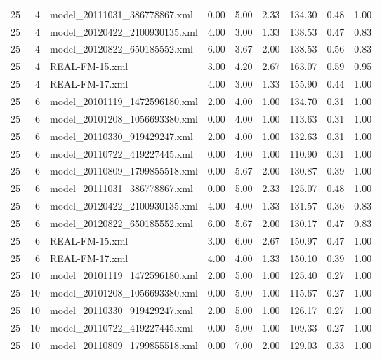 \begin{table}[ht]
\begin{tabular}{rrlrrrrrr}
   25 &   4 & model\_20111031\_386778867.xml & 0.00 & 5.00 & 2.33 & 134.30 & 0.48 & 1.00 \\ 
   25 &   4 & model\_20120422\_2100930135.xml & 4.00 & 3.00 & 1.33 & 138.53 & 0.47 & 0.83 \\ 
   25 &   4 & model\_20120822\_650185552.xml & 6.00 & 3.67 & 2.00 & 138.53 & 0.56 & 0.83 \\ 
   25 &   4 & REAL-FM-15.xml & 3.00 & 4.20 & 2.67 & 163.07 & 0.59 & 0.95 \\ 
   25 &   4 & REAL-FM-17.xml & 4.00 & 3.00 & 1.33 & 155.90 & 0.44 & 1.00 \\ 
   25 &   6 & model\_20101119\_1472596180.xml & 2.00 & 4.00 & 1.00 & 134.70 & 0.31 & 1.00 \\ 
   25 &   6 & model\_20101208\_1056693380.xml & 0.00 & 4.00 & 1.00 & 113.63 & 0.31 & 1.00 \\ 
   25 &   6 & model\_20110330\_919429247.xml & 2.00 & 4.00 & 1.00 & 132.63 & 0.31 & 1.00 \\ 
   25 &   6 & model\_20110722\_419227445.xml & 0.00 & 4.00 & 1.00 & 110.90 & 0.31 & 1.00 \\ 
   25 &   6 & model\_20110809\_1799855518.xml & 0.00 & 5.67 & 2.00 & 130.87 & 0.39 & 1.00 \\ 
   25 &   6 & model\_20111031\_386778867.xml & 0.00 & 5.00 & 2.33 & 125.07 & 0.48 & 1.00 \\ 
   25 &   6 & model\_20120422\_2100930135.xml & 4.00 & 4.00 & 1.33 & 131.57 & 0.36 & 0.83 \\ 
   25 &   6 & model\_20120822\_650185552.xml & 6.00 & 5.67 & 2.00 & 130.17 & 0.47 & 0.83 \\ 
   25 &   6 & REAL-FM-15.xml & 3.00 & 6.00 & 2.67 & 150.97 & 0.47 & 1.00 \\ 
   25 &   6 & REAL-FM-17.xml & 4.00 & 4.00 & 1.33 & 150.10 & 0.39 & 1.00 \\ 
   25 &  10 & model\_20101119\_1472596180.xml & 2.00 & 5.00 & 1.00 & 125.40 & 0.27 & 1.00 \\ 
   25 &  10 & model\_20101208\_1056693380.xml & 0.00 & 5.00 & 1.00 & 115.67 & 0.27 & 1.00 \\ 
   25 &  10 & model\_20110330\_919429247.xml & 2.00 & 5.00 & 1.00 & 126.17 & 0.27 & 1.00 \\ 
   25 &  10 & model\_20110722\_419227445.xml & 0.00 & 5.00 & 1.00 & 109.33 & 0.27 & 1.00 \\ 
   25 &  10 & model\_20110809\_1799855518.xml & 0.00 & 7.00 & 2.00 & 129.03 & 0.33 & 1.00 \\ 

\end{tabular}
\end{table}
